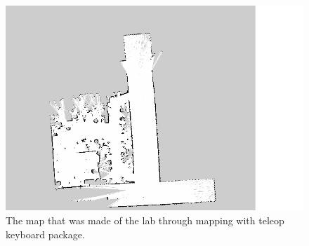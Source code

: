 

\begin{figure}
	\centering
	\includegraphics[width=\textwidth]{./img/real_lab.png}
	\caption{The map that was made of the lab through mapping with teleop keyboard package.}
	\label{fig:1:map}
\end{figure}